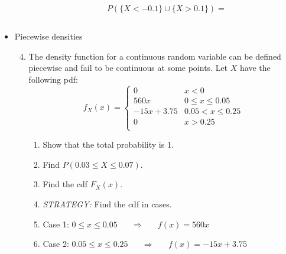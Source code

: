 \documentclass{article}
\begin{document}
\begin{itemize}
\begin{itemize}
\begin{align*}
            &P(\{X < -0.1\} \cup \{X > 0.1\}) = \\\\
        \end{align*}
    \end{itemize}\bigskip
    \item[] Piecewise densities
    \begin{enumerate}\setcounter{enumi}{3}
        \item The density function for a continuous random variable can be defined piecewise and fail to be continuous at some points. Let $X$ have the following pdf:
        \[
        f_X(x) =
            \left\{
            \begin{array}{ll}
                 0 & x < 0\\
                 560x & 0 \le x \le 0.05\\
                 -15x + 3.75 & 0.05 < x \le 0.25\\
                 0 & x > 0.25\\
            \end{array}
            \right.
        \]
        \begin{enumerate}
            \item Show that the total probability is 1.\vspace{220pt}
            \item Find $P(0.03 \le X \le 0.07)$.\vspace{220pt}\newpage
            \item Find the cdf $F_X(x)$.
            \item[] \textit{STRATEGY:} Find the cdf in cases.\bigskip\bigskip
            \item[] Case 1: $0 \le x \le 0.05 \hspace{20pt} \Longrightarrow \hspace{20pt} f(x) = 560x$\vspace{200pt}
            \item[] Case 2: $0.05 \le x \le 0.25 \hspace{20pt} \Longrightarrow \hspace{20pt} f(x) = -15x + 3.75$
        \end{enumerate}
    \end{enumerate}   
\end{itemize}
\end{document}
